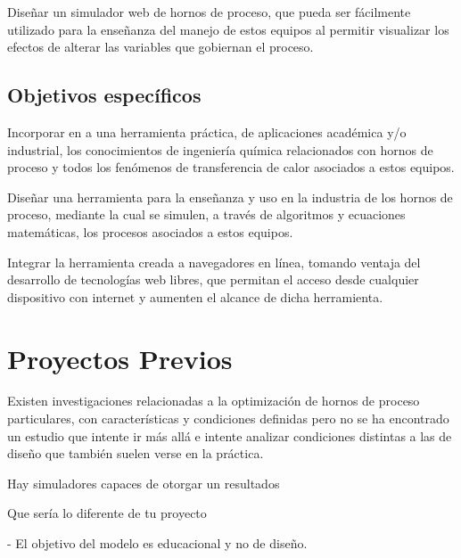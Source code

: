 \par Diseñar un simulador web de hornos de proceso, que pueda ser fácilmente utilizado para la enseñanza del manejo de estos equipos al permitir visualizar los efectos de alterar las variables que gobiernan el proceso.

\subsection{Objetivos específicos}

\par Incorporar en a una herramienta práctica, de aplicaciones académica y/o industrial, los conocimientos de ingeniería química relacionados con hornos de proceso y todos los fenómenos de transferencia de calor asociados a estos equipos.

\par Diseñar una herramienta para la enseñanza y uso en la industria de los hornos de proceso, mediante la cual se simulen, a través de algoritmos y ecuaciones matemáticas, los procesos asociados a estos equipos.

\par Integrar la herramienta creada a navegadores en línea, tomando ventaja del desarrollo de tecnologías web libres, que permitan el acceso desde cualquier dispositivo con internet y aumenten el alcance de dicha herramienta.

\section{Proyectos Previos}

\par Existen investigaciones relacionadas a la optimización de hornos de proceso particulares, con características y condiciones definidas pero no se ha encontrado un estudio que intente ir más allá e intente analizar condiciones distintas a las de diseño que también suelen verse en la práctica.

\par Hay simuladores capaces de otorgar un resultados 

Que sería lo diferente de tu proyecto

- El objetivo del modelo es educacional y no de diseño.